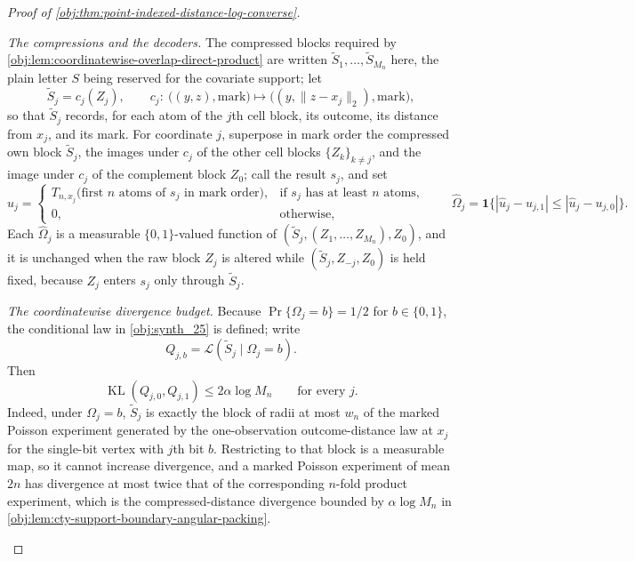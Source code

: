 \documentclass[11pt]{article}
\begin{document}
\begin{proof}[Proof of \cref{obj:thm:point-indexed-distance-log-converse}]
\begin{enumerate}
\emph{The compressions and the decoders.}  The compressed blocks required by \cref{obj:lem:coordinatewise-overlap-direct-product} are written \(\widetilde S_1,\ldots,\widetilde S_{M_n}\) here, the plain letter \(S\) being reserved for the covariate support; let
\[
\widetilde S_j=c_j(Z_j),
\qquad
c_j:\ \bigl((y,z),\text{mark}\bigr)\longmapsto\bigl((y,\lVert z-x_j\rVert_2),\text{mark}\bigr),
\]
so that \(\widetilde S_j\) records, for each atom of the \(j\)th cell block, its outcome, its distance from \(x_j\), and its mark.
For coordinate \(j\), superpose in mark order the compressed own block \(\widetilde S_j\), the images under \(c_j\) of the other cell blocks \(\{Z_k\}_{k\neq j}\), and the image under \(c_j\) of the complement block \(Z_0\); call the result \(s_j\), and set
\[
\widehat u_j
=
\begin{cases}
T_{n,x_j}\bigl(\text{first \(n\) atoms of }s_j\text{ in mark order}\bigr), & \text{if }s_j\text{ has at least \(n\) atoms},\\
0,&\text{otherwise,}
\end{cases}
\qquad
\widehat\Omega_j=\mathbf 1\bigl\{|\widehat u_j-u_{j,1}|\le|\widehat u_j-u_{j,0}|\bigr\}.
\]
Each \(\widehat\Omega_j\) is a measurable \(\{0,1\}\)-valued function of \((\widetilde S_j,(Z_1,\ldots,Z_{M_n}),Z_0)\), and it is unchanged when the raw block \(Z_j\) is altered while \((\widetilde S_j,Z_{-j},Z_0)\) is held fixed, because \(Z_j\) enters \(s_j\) only through \(\widetilde S_j\).

\emph{The coordinatewise divergence budget.}  Because \(\Pr\{\Omega_j=b\}=1/2\) for \(b\in\{0,1\}\), the conditional law in \cref{obj:synth_25} is defined; write
\[
Q_{j,b}=\mathcal L(\widetilde S_j\mid\Omega_j=b).
\]
Then
\[
\operatorname{KL}(Q_{j,0},Q_{j,1})\le 2\alpha\log M_n
\qquad\text{for every }j .
\]
Indeed, under \(\Omega_j=b\), \(\widetilde S_j\) is exactly the block of radii at most \(w_n\) of the marked Poisson experiment generated by the one-observation outcome-distance law at \(x_j\) for the single-bit vertex with \(j\)th bit \(b\).  Restricting to that block is a measurable map, so it cannot increase divergence, and a marked Poisson experiment of mean \(2n\) has divergence at most twice that of the corresponding \(n\)-fold product experiment, which is the compressed-distance divergence bounded by \(\alpha\log M_n\) in \cref{obj:lem:cty-support-boundary-angular-packing}.


\end{enumerate}
\end{proof}
\end{document}
